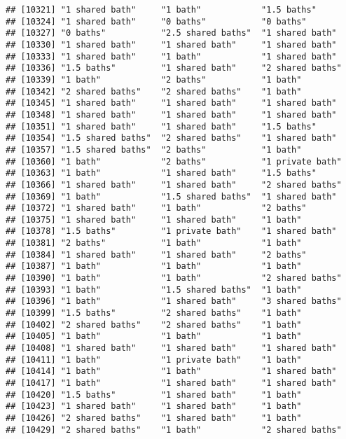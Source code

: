 \documentclass[
]{article}
\begin{document}
\begin{verbatim}
## [10321] "1 shared bath"     "1 bath"            "1.5 baths"        
## [10324] "1 shared bath"     "0 baths"           "0 baths"          
## [10327] "0 baths"           "2.5 shared baths"  "1 shared bath"    
## [10330] "1 shared bath"     "1 shared bath"     "1 shared bath"    
## [10333] "1 shared bath"     "1 bath"            "1 shared bath"    
## [10336] "1.5 baths"         "1 shared bath"     "2 shared baths"   
## [10339] "1 bath"            "2 baths"           "1 bath"           
## [10342] "2 shared baths"    "2 shared baths"    "1 bath"           
## [10345] "1 shared bath"     "1 shared bath"     "1 shared bath"    
## [10348] "1 shared bath"     "1 shared bath"     "1 shared bath"    
## [10351] "1 shared bath"     "1 shared bath"     "1.5 baths"        
## [10354] "1.5 shared baths"  "2 shared baths"    "1 shared bath"    
## [10357] "1.5 shared baths"  "2 baths"           "1 bath"           
## [10360] "1 bath"            "2 baths"           "1 private bath"   
## [10363] "1 bath"            "1 shared bath"     "1.5 baths"        
## [10366] "1 shared bath"     "1 shared bath"     "2 shared baths"   
## [10369] "1 bath"            "1.5 shared baths"  "1 shared bath"    
## [10372] "1 shared bath"     "1 bath"            "2 baths"          
## [10375] "1 shared bath"     "1 shared bath"     "1 bath"           
## [10378] "1.5 baths"         "1 private bath"    "1 shared bath"    
## [10381] "2 baths"           "1 bath"            "1 bath"           
## [10384] "1 shared bath"     "1 shared bath"     "2 baths"          
## [10387] "1 bath"            "1 bath"            "1 bath"           
## [10390] "1 bath"            "1 bath"            "2 shared baths"   
## [10393] "1 bath"            "1.5 shared baths"  "1 bath"           
## [10396] "1 bath"            "1 shared bath"     "3 shared baths"   
## [10399] "1.5 baths"         "2 shared baths"    "1 bath"           
## [10402] "2 shared baths"    "2 shared baths"    "1 bath"           
## [10405] "1 bath"            "1 bath"            "1 bath"           
## [10408] "1 shared bath"     "1 shared bath"     "1 shared bath"    
## [10411] "1 bath"            "1 private bath"    "1 bath"           
## [10414] "1 bath"            "1 bath"            "1 shared bath"    
## [10417] "1 bath"            "1 shared bath"     "1 shared bath"    
## [10420] "1.5 baths"         "1 shared bath"     "1 bath"           
## [10423] "1 shared bath"     "1 shared bath"     "1 bath"           
## [10426] "2 shared baths"    "1 shared bath"     "1 bath"           
## [10429] "2 shared baths"    "1 bath"            "2 shared baths"   

\end{verbatim}
\end{document}
